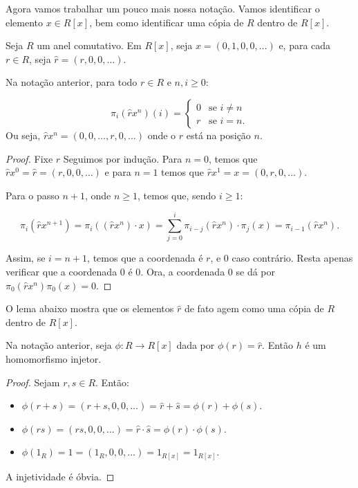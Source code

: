 Agora vamos trabalhar um pouco mais nossa notação.
Vamos identificar o elemento $x \in R[x]$, bem como identificar uma cópia de $R$ dentro de $R[x]$.

\begin{definition}
    Seja $R$ um anel comutativo. Em $R[x]$, seja $x=(0, 1, 0, 0, \dots)$ e, para cada $r \in R$, seja $\hat r=(r, 0, 0, \dots)$.
\end{definition}

\begin{lemma}
    Na notação anterior, para todo $r \in R$ e $n, i\geq 0$:

    $$\pi_i(\hat r x^n)(i)=\begin{cases}
        0 & \text{se } i\neq n\\
        r & \text{se } i=n.
    \end{cases}$$
    Ou seja, $\hat r x^n=(0, 0, \dots, r, 0, \dots)$ onde o $r$ está na posição $n$.
\end{lemma}

\begin{proof}
    Fixe $r$ Seguimos por indução. Para $n=0$, temos que $\hat rx^0=\hat r=(r, 0, 0, \dots)$ e para $n=1$ temos que $\hat r x^1=x=(0, r, 0, \dots)$.

    Para o passo $n+1$, onde $n\geq 1$, temos que, sendo $i\geq 1$:

    \[\pi_i(\hat rx^{n+1})=\pi_i((\hat rx^n)\cdot x)=\sum_{j=0}^i\pi_{i-j}(\hat r x^n)\cdot \pi_j(x)=\pi_{i-1}(\hat r x^n).\]

    Assim, se $i=n+1$, temos que a coordenada é $r$, e $0$ caso contrário. Resta apenas verificar que a coordenada $0$ é $0$. Ora, a coordenada $0$ se dá por $\pi_0(\hat r x^n)\pi_0(x)=0$.
\end{proof}

O lema abaixo mostra que os elementos $\hat r$ de fato agem como uma cópia de $R$ dentro de $R[x]$.

\begin{lemma}
    Na notação anterior, seja $\phi:R\rightarrow R[x]$ dada por $\phi(r)=\hat r$. Então $h$ é um homomorfismo injetor.
\end{lemma}
    
\begin{proof}
    Sejam $r, s \in R$. Então:
    \begin{itemize}
        \item $\phi(r+s)=(r+s, 0, 0, \dots)=\hat r+\hat s=\phi(r)+\phi(s)$.
        \item $\phi(rs)=(rs, 0, 0, \dots)=\hat r\cdot \hat s=\phi(r)\cdot \phi(s)$.
        \item $\phi(1_R)=\hat 1=(1_R, 0, 0, \dots)=1_{R[x]}=1_{R[x]}$.
    \end{itemize}

    A injetividade é óbvia.
\end{proof}


